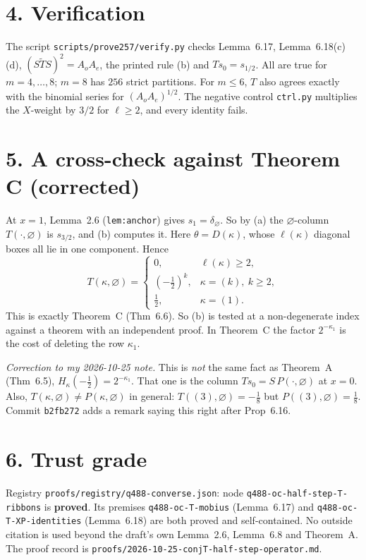 \documentclass[11pt]{article}
\begin{document}
\section*{4. Verification}
The script \texttt{scripts/prove257/verify.py} checks Lemma~6.17, Lemma~6.18(c)(d), $(S\tilde TS)^2=A_oA_e$, the
printed rule (b) and $Ts_0=s_{1/2}$. All are true for $m=4,\dots,8$; $m=8$ has $256$ strict partitions. For $m\le6$,
$T$ also agrees exactly with the binomial series for $(A_oA_e)^{1/2}$. The negative control \texttt{ctrl.py}
multiplies the $X$-weight by $3/2$ for $\ell\ge2$, and every identity fails.

\section*{5. A cross-check against Theorem C (corrected)}
At $x=1$, Lemma~2.6 (\texttt{lem:anchor}) gives $s_1=\delta_\varnothing$. So by (a) the $\varnothing$-column
$T(\cdot,\varnothing)$ is $s_{3/2}$, and (b) computes it. Here $\theta=D(\kappa)$, whose $\ell(\kappa)$ diagonal boxes
all lie in one component. Hence
\[T(\kappa,\varnothing)=\begin{cases}0,&\ell(\kappa)\ge2,\\ (-\tfrac12)^k,&\kappa=(k),\ k\ge2,\\ \tfrac12,&\kappa=(1).\end{cases}\]
This is exactly Theorem~C (Thm~6.6). So (b) is tested at a non-degenerate index against a theorem with an independent
proof. In Theorem~C the factor $2^{-\kappa_1}$ is the cost of deleting the row $\kappa_1$.

\emph{Correction to my 2026-10-25 note.} This is \emph{not} the same fact as Theorem~A (Thm~6.5),
$H_\kappa(-\tfrac12)=2^{-\kappa_1}$. That one is the column $Ts_0=S\,P(\cdot,\varnothing)$ at $x=0$. Also,
$T(\kappa,\varnothing)\ne P(\kappa,\varnothing)$ in general: $T((3),\varnothing)=-\tfrac18$ but
$P((3),\varnothing)=\tfrac18$. Commit \texttt{b2fb272} adds a remark saying this right after Prop~6.16.

\section*{6. Trust grade}
Registry \texttt{proofs/registry/q488-converse.json}: node \texttt{q488-oc-half-step-T-ribbons} is \textbf{proved}. Its
premises \texttt{q488-oc-T-mobius} (Lemma~6.17) and \texttt{q488-oc-T-XP-identities} (Lemma~6.18) are both proved and
self-contained. No outside citation is used beyond the draft's own Lemma~2.6, Lemma~6.8 and Theorem~A.
The proof record is \texttt{proofs/2026-10-25-conjT-half-step-operator.md}.
\end{document}
